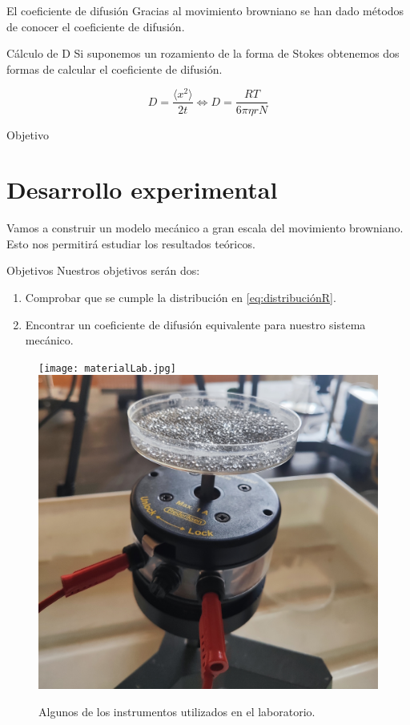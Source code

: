 \documentclass{beamer}
\begin{document}
\begin{frame}{El coeficiente de difusión}
Gracias al movimiento browniano se han dado métodos de conocer el coeficiente de difusión.

\begin{block}{Cálculo de D}
Si suponemos un rozamiento de la forma de Stokes obtenemos dos formas de calcular el coeficiente de difusión.

\begin{equation}
D = \frac{\langle x^2 \rangle}{2t} \iff D = \frac{RT}{6 \pi \eta r N}
\label{eq:difusionT}
\end{equation}
\end{block}
\end{frame}

\begin{frame}{Objetivo}
\section{Desarrollo experimental}
Vamos a construir un modelo mecánico a gran escala del movimiento browniano. Esto nos permitirá estudiar los resultados teóricos.

\begin{block}{Objetivos}
Nuestros objetivos serán dos:

\begin{enumerate}
\item Comprobar que se cumple la distribución en \ref{eq:distribuciónR}.
\item Encontrar un coeficiente de difusión equivalente para nuestro sistema mecánico.
\end{enumerate}
\end{block}

\begin{figure}[h!]
\begin{center}
\texttt{[image: materialLab.jpg]}
\>
\includegraphics[scale=0.025]{bolitas.jpg}
\caption{Algunos de los instrumentos utilizados en el laboratorio.}
\end{center}
\end{figure}
\end{frame}
\end{document}
